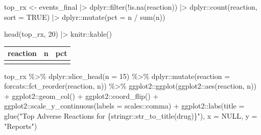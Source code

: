 \documentclass[
  letterpaper,
  DIV=11,
  numbers=noendperiod]{scrartcl}
\newenvironment{Shaded}{\begin{snugshade}}{\end{snugshade}}
\newcommand{\AttributeTok}[1]{\textcolor[rgb]{0.40,0.45,0.13}{#1}}
\newcommand{\ConstantTok}[1]{\textcolor[rgb]{0.56,0.35,0.01}{#1}}
\newcommand{\DecValTok}[1]{\textcolor[rgb]{0.68,0.00,0.00}{#1}}
\newcommand{\FunctionTok}[1]{\textcolor[rgb]{0.28,0.35,0.67}{#1}}
\newcommand{\NormalTok}[1]{\textcolor[rgb]{0.00,0.23,0.31}{#1}}
\newcommand{\OtherTok}[1]{\textcolor[rgb]{0.00,0.23,0.31}{#1}}
\newcommand{\SpecialCharTok}[1]{\textcolor[rgb]{0.37,0.37,0.37}{#1}}
\newcommand{\StringTok}[1]{\textcolor[rgb]{0.13,0.47,0.30}{#1}}
\begin{document}
\begin{Shaded}
\begin{Highlighting}[]
\NormalTok{top\_rx }\OtherTok{\textless{}{-}}\NormalTok{ events\_final }\SpecialCharTok{|\textgreater{}}
\NormalTok{  dplyr}\SpecialCharTok{::}\FunctionTok{filter}\NormalTok{(}\SpecialCharTok{!}\FunctionTok{is.na}\NormalTok{(reaction)) }\SpecialCharTok{|\textgreater{}}
\NormalTok{  dplyr}\SpecialCharTok{::}\FunctionTok{count}\NormalTok{(reaction, }\AttributeTok{sort =} \ConstantTok{TRUE}\NormalTok{) }\SpecialCharTok{|\textgreater{}}
\NormalTok{  dplyr}\SpecialCharTok{::}\FunctionTok{mutate}\NormalTok{(}\AttributeTok{pct =}\NormalTok{ n }\SpecialCharTok{/} \FunctionTok{sum}\NormalTok{(n))}

\FunctionTok{head}\NormalTok{(top\_rx, }\DecValTok{20}\NormalTok{) }\SpecialCharTok{|\textgreater{}}
\NormalTok{  knitr}\SpecialCharTok{::}\FunctionTok{kable}\NormalTok{()}
\end{Highlighting}
\end{Shaded}

\begin{longtable}[]{@{}lrr@{}}
\toprule\noalign{}
reaction & n & pct \\
\midrule\noalign{}
\endhead
\bottomrule\noalign{}
\endlastfoot
\end{longtable}

\begin{Shaded}
\begin{Highlighting}[]
\NormalTok{top\_rx }\SpecialCharTok{\%\textgreater{}\%}
\NormalTok{  dplyr}\SpecialCharTok{::}\FunctionTok{slice\_head}\NormalTok{(}\AttributeTok{n =} \DecValTok{15}\NormalTok{) }\SpecialCharTok{\%\textgreater{}\%}
\NormalTok{  dplyr}\SpecialCharTok{::}\FunctionTok{mutate}\NormalTok{(}\AttributeTok{reaction =}\NormalTok{ forcats}\SpecialCharTok{::}\FunctionTok{fct\_reorder}\NormalTok{(reaction, n)) }\SpecialCharTok{\%\textgreater{}\%}
\NormalTok{  ggplot2}\SpecialCharTok{::}\FunctionTok{ggplot}\NormalTok{(ggplot2}\SpecialCharTok{::}\FunctionTok{aes}\NormalTok{(reaction, n)) }\SpecialCharTok{+}
\NormalTok{  ggplot2}\SpecialCharTok{::}\FunctionTok{geom\_col}\NormalTok{() }\SpecialCharTok{+}
\NormalTok{  ggplot2}\SpecialCharTok{::}\FunctionTok{coord\_flip}\NormalTok{() }\SpecialCharTok{+}
\NormalTok{  ggplot2}\SpecialCharTok{::}\FunctionTok{scale\_y\_continuous}\NormalTok{(}\AttributeTok{labels =}\NormalTok{ scales}\SpecialCharTok{::}\NormalTok{comma) }\SpecialCharTok{+}
\NormalTok{  ggplot2}\SpecialCharTok{::}\FunctionTok{labs}\NormalTok{(}\AttributeTok{title =} \FunctionTok{glue}\NormalTok{(}\StringTok{"Top Adverse Reactions for \{stringr::str\_to\_title(drug)\}"}\NormalTok{),}
       \AttributeTok{x =} \ConstantTok{NULL}\NormalTok{, }\AttributeTok{y =} \StringTok{"Reports"}\NormalTok{)}
\end{Highlighting}
\end{Shaded}
\end{document}
